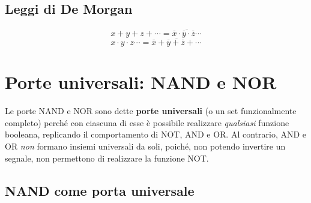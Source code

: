 \subsection{Leggi di De Morgan}
\label{sec:demorgan}

\[
x+y+z+\cdots = \overline{\overline{x}\cdot\overline{y}\cdot\overline{z}\cdots}
\]
\[
x\cdot y\cdot z\cdots = \overline{\overline{x}+\overline{y}+\overline{z}+\cdots}
\]

\section{Porte universali: NAND e NOR}

Le porte NAND e NOR sono dette \textbf{porte universali} (o un set funzionalmente completo) perché con ciascuna di esse è possibile realizzare \emph{qualsiasi} funzione booleana, replicando il comportamento di NOT, AND e OR. 
Al contrario, AND e OR \emph{non} formano insiemi universali da soli, poiché, non potendo invertire un segnale, non permettono di realizzare la funzione NOT.

\subsection{NAND come porta universale}

